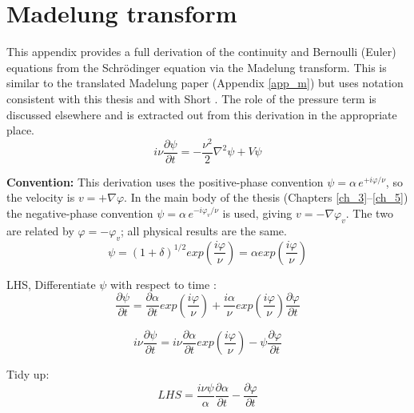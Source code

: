 %
%
\section{Madelung transform}
\label{app_mtrans}
This appendix provides a full derivation of the continuity and Bernoulli (Euler) equations from the Schr\"odinger equation via the Madelung transform. This is similar to the translated Madelung paper (Appendix \ref{app_m}) but uses notation consistent with this thesis and with Short \citep{bib_short}. The role of the pressure term is discussed elsewhere and is extracted out from this derivation in the appropriate place.
\begin{equation}
i\nu\frac{\partial\psi}{\partial t}= -\frac{\nu^2}{2}\nabla^2\psi + V\psi
\end{equation}

\noindent \textbf{Convention:} This derivation uses the positive-phase convention $\psi = \alpha\, e^{+i\varphi/\nu}$, so the velocity is $v = +\nabla\varphi$. In the main body of the thesis (Chapters \ref{ch_3}--\ref{ch_5}) the negative-phase convention $\psi = \alpha\, e^{-i\varphi_v/\nu}$ is used, giving $v = -\nabla\varphi_v$. The two are related by $\varphi = -\varphi_v$; all physical results are the same.
\begin{equation}
 \psi = (1+ \delta)^{1/2}exp\left(\frac{i\varphi}{\nu}\right) = \alpha exp\left(\frac{i\varphi}{\nu}\right)
\end{equation}

\noindent LHS, Differentiate $\psi$ with respect to time :
\begin{equation}
\frac{\partial\psi}{\partial t} = \frac{\partial\alpha}{\partial t}exp\left(\frac{i\varphi}{\nu}\right) + \frac{i\alpha}{\nu}exp\left(\frac{i\varphi}{\nu}\right)\frac{\partial\varphi}{\partial t}
\end{equation}

\begin{equation}
i\nu\frac{\partial\psi}{\partial t}=i\nu\frac{\partial\alpha}{\partial t}exp\left(\frac{i\varphi}{\nu}\right)-\psi\frac{\partial\varphi}{\partial t}
\end{equation}

\noindent Tidy up:
\begin{equation}
LHS = \frac{i\nu\psi}{\alpha}\frac{\partial\alpha}{\partial t} - \frac{\partial\varphi}{\partial t}
\end{equation}

